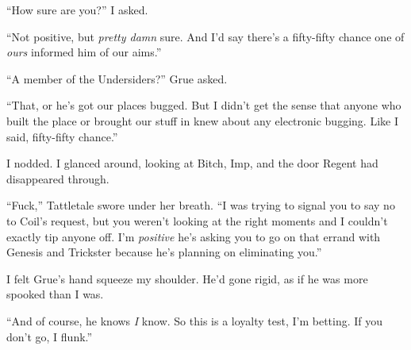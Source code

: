 ``How sure are you?'' I asked.



``Not positive, but \emph{pretty damn} sure.  And I'd say there's a fifty-fifty chance one of \emph{ours} informed him of our aims.''



``A member of the Undersiders?'' Grue asked.



``That, or he's got our places bugged.  But I didn't get the sense that anyone who built the place or brought our stuff in knew about any electronic bugging.  Like I said, fifty-fifty chance.''



I nodded.  I glanced around, looking at Bitch, Imp, and the door Regent had disappeared through.



``Fuck,'' Tattletale swore under her breath.  ``I was trying to signal you to say no to Coil's request, but you weren't looking at the right moments and I couldn't exactly tip anyone off.  I'm \emph{positive }he's asking you to go on that errand with Genesis and Trickster because he's planning on eliminating you.''



I felt Grue's hand squeeze my shoulder.  He'd gone rigid, as if he was more spooked than I was.



``And of course, he knows \emph{I} know.  So this is a loyalty test, I'm betting.  If you don't go, I flunk.''





